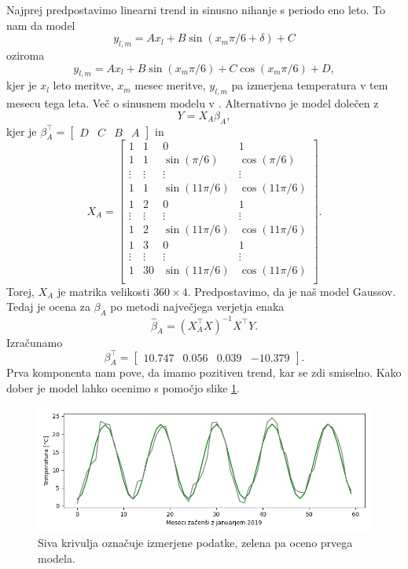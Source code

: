 \documentclass[12pt, a4paper]{article}
\begin{document}
Najprej predpostavimo linearni trend in sinusno nihanje s periodo eno leto. 
To nam da model
\[
    y_{l,m} = Ax_l + B\sin(x_m\pi/6 + \delta) + C
\]
oziroma
\[
    y_{l,m} = Ax_l + B\sin(x_m\pi/6) + C\cos(x_m\pi/6) + D,
\]
kjer je $x_l$ leto meritve, $x_m$ mesec meritve, $y_{l,m}$ pa 
izmerjena temperatura v tem mesecu tega leta. Več o sinusnem 
modelu v \cite{wiki:Sinusoidal_model}. Alternativno je model 
dolečen z
\[
    Y = X_A\beta_A,
\]
kjer je $\beta_A^\top = \begin{bmatrix}
    D & C & B & A
\end{bmatrix}$ in
\[
    X_A = \begin{bmatrix}
        1 & 1 & 0 & 1 \\
        1 & 1 & \sin\left(\pi/6\right) & \cos\left(\pi/6\right) \\
        \vdots & \vdots & \vdots & \vdots \\
        1 & 1 &  \sin\left(11\pi/6\right) & \cos\left(11\pi/6\right) \\
        1 & 2 & 0 & 1 \\
        \vdots & \vdots & \vdots & \vdots \\
        1 & 2 &  \sin\left(11\pi/6\right) & \cos\left(11\pi/6\right) \\
        1 & 3 &  0 & 1 \\
        \vdots & \vdots & \vdots & \vdots \\
        1 & 30 & \sin\left(11\pi/6\right) & \cos\left(11\pi/6\right)\\
        \end{bmatrix}.
\]
Torej, $X_A$ je matrika velikosti $360 \times 4$. Predpostavimo, da je 
naš model Gaussov. Tedaj je ocena za $\beta_A$ po metodi največjega 
verjetja enaka
\[
    \hat \beta_A = (X_A^\top X)^{-1} X^\top Y.
\]
Izračunamo
\[
    \beta_A^\top = \begin{bmatrix}
        10.747 & 0.056 & 0.039 & -10.379
    \end{bmatrix}.
\]
Prva komponenta nam pove, da imamo pozitiven trend, kar se zdi 
smiselno. Kako dober je model lahko ocenimo s pomočjo slike 
\ref{png:prvi}.
\begin{figure}[H]
    \centering
    \includegraphics[width=14cm]{Slike/prvi_model.png}
    \caption{Siva krivulja označuje izmerjene podatke, zelena pa oceno 
    prvega modela.}
    \label{png:prvi}
\end{figure}
\end{document}
